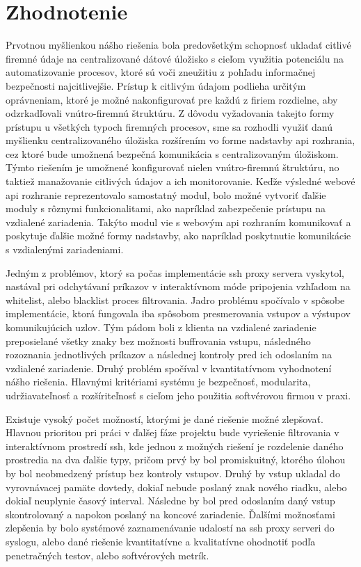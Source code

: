 \chapter{Zhodnotenie}\label{ch:zhodnotenie}

Prvotnou myšlienkou nášho riešenia bola predovšetkým schopnosť ukladať citlivé firemné údaje na centralizované dátové úložisko
s cieľom využitia potenciálu na automatizovanie procesov, ktoré sú voči zneužitiu z pohľadu informačnej bezpečnosti
najcitlivejšie.
Prístup k citlivým údajom podlieha určitým oprávneniam, ktoré je možné nakonfigurovať pre každú z firiem rozdielne, aby
odzrkadľovali vnútro-firemnú štruktúru.
Z dôvodu vyžadovania takejto formy prístupu u všetkých typoch firemných procesov, sme sa rozhodli využiť danú myšlienku
centralizovaného úložiska rozšírením vo forme nadstavby api rozhrania, cez ktoré bude umožnená bezpečná komunikácia s centralizovaným
úložiskom.
Týmto riešením je umožnené konfigurovať nielen vnútro-firemnú štruktúru, no taktiež manažovanie citlivých údajov a ich monitorovanie.
Keďže výsledné webové api rozhranie reprezentovalo samostatný modul, bolo možné vytvoriť ďalšie moduly s rôznymi funkcionalitami,
ako napríklad zabezpečenie prístupu na vzdialené zariadenia.
Takýto modul vie s webovým api rozhraním komunikovať a poskytuje ďalšie možné formy nadstavby, ako napríklad poskytnutie
komunikácie s vzdialenými zariadeniami.

Jedným z problémov, ktorý sa počas implementácie ssh proxy servera vyskytol, nastával pri odchytávaní príkazov v interaktívnom
móde pripojenia vzhľadom na whitelist, alebo blacklist proces filtrovania.
Jadro problému spočívalo v spôsobe implementácie, ktorá fungovala iba spôsobom presmerovania vstupov a výstupov komunikujúcich
uzlov.
Tým pádom boli z klienta na vzdialené zariadenie preposielané všetky znaky bez možnosti buffrovania vstupu, následného
rozoznania jednotlivých príkazov a následnej kontroly pred ich odoslaním na vzdialené zariadenie.
Druhý problém spočíval v kvantitatívnom vyhodnotení nášho riešenia.
Hlavnými kritériami systému je bezpečnosť, modularita, udržiavateľnosť a rozšíriteľnosť s cieľom jeho použitia softvérovou
firmou v praxi.

Existuje vysoký počet možností, ktorými je dané riešenie možné zlepšovať.
Hlavnou prioritou pri práci v ďalšej fáze projektu bude vyriešenie filtrovania v interaktívnom prostredí ssh, kde jednou
z možných riešení je rozdelenie daného prostredia na dva ďalšie typy, pričom prvý by bol promiskuitný, ktorého úlohou
by bol neobmedzený prístup bez kontroly vstupov.
Druhý by vstup ukladal do vyrovnávacej pamäte dovtedy, dokiaľ nebude poslaný znak nového riadku, alebo dokiaľ neuplynie
časový interval.
Následne by bol pred odoslaním daný vstup skontrolovaný a napokon poslaný na koncové zariadenie.
Ďalšími možnosťami zlepšenia by bolo systémové zaznamenávanie udalostí na ssh proxy serveri do syslogu, alebo dané riešenie
kvantitatívne a kvalitatívne ohodnotiť podľa penetračných testov, alebo softvérových metrík.
